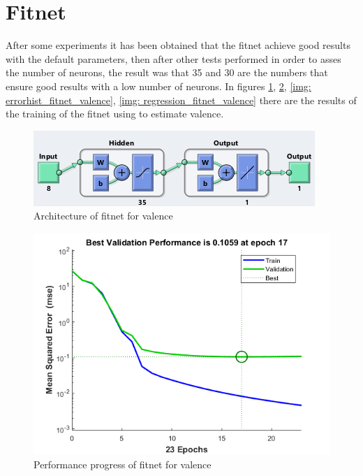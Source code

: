 \documentclass[a4paper]{report}
\begin{document}
	\section{Fitnet}
	\noindent After some experiments it has been obtained that the fitnet achieve good results with the default parameters, then after other tests performed in order to asses the number of neurons, the result was that 35 and 30 are the numbers that ensure good results with a low number of neurons.
	In figures \ref{img: fitnet_valence}, \ref{img: perf_fitnet_valence}, \ref{img: errorhist_fitnet_valence}, \ref{img: regression_fitnet_valence} there are the results of the training of the fitnet using to estimate valence.
		\begin{figure}[htbp]
		\centering
		\includegraphics[scale=0.8]{img/fitnet_valence.png}
		\caption{Architecture of fitnet for valence}
		\label{img: fitnet_valence}
	\end{figure}
	
		\begin{figure}[htbp]
		\centering
		\includegraphics[scale=0.7]{img/perf_fitnet_valence.png}
		\caption{Performance progress of fitnet for valence}
		\label{img: perf_fitnet_valence}
	\end{figure}
	
\end{document}
